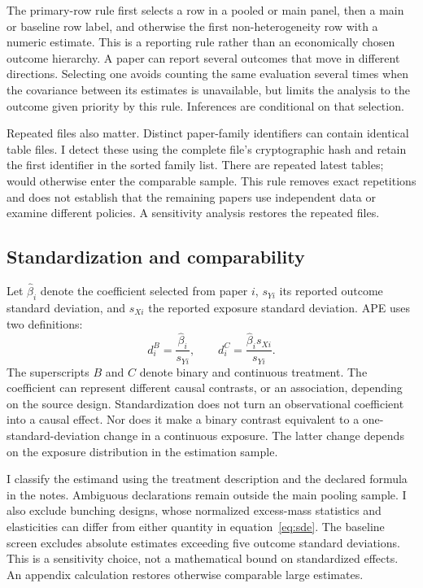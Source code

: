 \documentclass[11pt]{article}
\begin{document}
The primary-row rule first selects a row in a pooled or main panel, then a main or baseline row label, and otherwise the first non-heterogeneity row with a numeric estimate. This is a reporting rule rather than an economically chosen outcome hierarchy. A paper can report several outcomes that move in different directions. Selecting one avoids counting the same evaluation several times when the covariance between its estimates is unavailable, but limits the analysis to the outcome given priority by this rule. Inferences are conditional on that selection.

Repeated files also matter. Distinct paper-family identifiers can contain identical table files. I detect these using the complete file's cryptographic hash and retain the first identifier in the sorted family list. There are \DuplicateN{} repeated latest tables; \ComparableDuplicateN{} would otherwise enter the comparable sample. This rule removes exact repetitions and does not establish that the remaining papers use independent data or examine different policies. A sensitivity analysis restores the repeated files.

\subsection{Standardization and comparability}
Let $\widehat\beta_i$ denote the coefficient selected from paper $i$, $s_{Yi}$ its reported outcome standard deviation, and $s_{Xi}$ the reported exposure standard deviation. APE uses two definitions:
\begin{equation}\label{eq:sde}
 d_i^{B}=\frac{\widehat\beta_i}{s_{Yi}}, \qquad
 d_i^{C}=\frac{\widehat\beta_i s_{Xi}}{s_{Yi}}.
\end{equation}
The superscripts $B$ and $C$ denote binary and continuous treatment. The coefficient can represent different causal contrasts, or an association, depending on the source design. Standardization does not turn an observational coefficient into a causal effect. Nor does it make a binary contrast equivalent to a one-standard-deviation change in a continuous exposure. The latter change depends on the exposure distribution in the estimation sample.

I classify the estimand using the treatment description and the declared formula in the notes. Ambiguous declarations remain outside the main pooling sample. I also exclude bunching designs, whose normalized excess-mass statistics and elasticities can differ from either quantity in equation~\eqref{eq:sde}. The baseline screen excludes absolute estimates exceeding five outcome standard deviations. This is a sensitivity choice, not a mathematical bound on standardized effects. An appendix calculation restores otherwise comparable large estimates.
\end{document}

